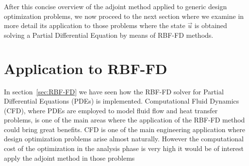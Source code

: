 After this concise overview of the adjoint method applied to generic design optimization problems, we now proceed to the next section where we examine in more detail its application to those problems where the state $\vec{u}$ is obtained solving a Partial Differential Equation by means of RBF-FD methods.



\section{Application to RBF-FD}

In section~\ref{sec:RBF-FD} we have seen how the RBF-FD solver for Partial Differential Equations (PDEs) is implemented. Computational Fluid Dynamics (CFD), where PDEs are employed to model fluid flow and heat transfer problems, is one of the main areas where the application of the RBF-FD method could bring great benefits.
CFD is one of the main engineering application where design optimization problems arise almost naturally. However the computational cost of the optimization in the analysis phase is very high it would be of interest apply the adjoint method in those problems

